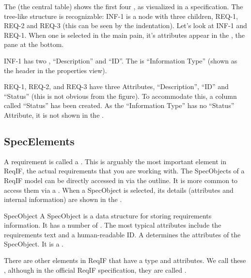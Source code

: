 The  (the central table) shows the first four , as visualized in a specification.  The tree-like structure is recognizable: INF-1 is a node
with three children, REQ-1, REQ-2 and REQ-3 (this can be seen by the indentation).  Let's look at INF-1 and REQ-1.  When one is selected in the main pain, it's attributes appear in the , the pane at the bottom.

INF-1 has two , ``Description'' and ``ID''.  The  is ``Information Type'' (shown as the header in the properties view).

REQ-1, REQ-2, and REQ-3 have three Attributes, ``Description'', ``ID'' and ``Status'' (this is not obvious from the figure).  To accommodate this, a column called ``Status'' has been created.  As the ``Information Type'' has no ``Status'' Attribute, it is not shown in the .

\subsection{SpecElements}
\label{sec:specelements}

A requirement is called a .  This is arguably the most important element in ReqIF, the actual requirements that you are working with.  The SpecObjects of a ReqIF model can be directly accessed in \pror{} via the outline.  It is more common to access them via a .  When a SpecObject is selected, its details (attributes and internal information) are shown in the .

\begin{definition}{SpecObject}
A SpecObject is a data structure for storing requirements information.  It has a number of .  The most typical attributes include the requirements text and a human-readable ID. A  determines the attributes of the SpecObject. It is a .
\end{definition}

There are other elements in ReqIF that have a type and attributes.  We call these , although in the official ReqIF specification, they are called .

